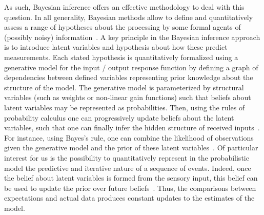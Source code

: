 \documentclass[12pt,english]{article}%
\newcommand{\citep}[1]{\parencite{#1}}
\begin{document}
As such, Bayesian inference offers an effective methodology
to deal with this question.
In all generality, Bayesian methods allow to define and quantitatively assess
a range of hypotheses about the processing by some formal agents
of (possibly noisy) information~\citep{Deneve1999, Diaconescu2014, Daunizeau10a}.
A key principle in the Bayesian inference approach is
to introduce latent variables and hypothesis about how these predict measurements.
Each stated hypothesis is quantitatively formalized
using a generative model for the input / output response function
by defining a graph of dependencies between defined variables
representing prior knowledge about the structure of the model.
The generative model is parameterized by structural variables
(such as weights or non-linear gain functions)
such that beliefs about latent variables
may be represented as probabilities.
Then, using the rules of probability calculus
one can progressively update beliefs about the latent variables,
such that one can finally infer the hidden structure of received inputs~\citep{Hoyer2003, Ma2014}.
For instance, using Bayes's rule, one can combine
the likelihood of observations given the generative model and
the prior of these latent variables~\citep{Janes2014}.
Of particular interest for us is the possibility to
quantitatively represent in the probabilistic model
the predictive and iterative nature of a sequence of events.
Indeed, once the belief about latent variables
is formed from the sensory input,
this belief can be used to update
the prior over future beliefs~\citep{Montagnini2007}.
Thus, the comparisons between expectations and actual data produces
constant updates to the estimates of the model.
\end{document}
